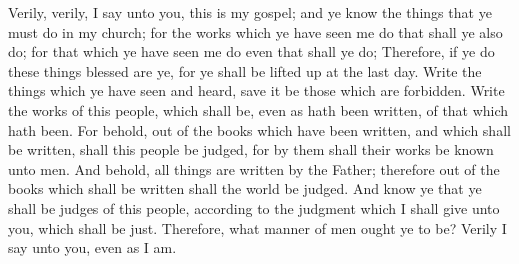 \bverse \iffalse Verily, verily, I say unto you, this is my gospel; and ye know the things that ye must do in my church; for the works which ye have seen me do that shall ye also do; for that which ye have seen me do even that shall ye do; \fi
Verily, verily, I say unto you, this is my gospel; and ye know the things that ye must do in my church; for the works which ye have seen me do that shall ye also do; for that which ye have seen me do even that shall ye do;
\bverse \iffalse Therefore, if ye do these things blessed are ye, for ye shall be lifted up at the last day. \fi
Therefore, if ye do these things blessed are ye, for ye shall be lifted up at the last day.
\bverse \iffalse Write the things which ye have seen and heard, save it be those which are forbidden. \fi
Write the things which ye have seen and heard, save it be those which are forbidden.
\bverse \iffalse Write the works of this people, which shall be, even as hath been written, of that which hath been. \fi
Write the works of this people, which shall be, even as hath been written, of that which hath been.
\bverse \iffalse For behold, out of the books which have been written, and which shall be written, shall this people be judged, for by them shall their works be known unto men. \fi
For behold, out of the books which have been written, and which shall be written, shall this people be judged, for by them shall their works be known unto men.
\bverse \iffalse And behold, all things are written by the Father; therefore out of the books which shall be written shall the world be judged. \fi
And behold, all things are written by the Father; therefore out of the books which shall be written shall the world be judged.
\bverse \iffalse And know ye that ye shall be judges of this people, according to the judgment which I shall give unto you, which shall be just. \fi
And know ye that ye shall be judges of this people, according to the judgment which I shall give unto you, which shall be just.
Therefore, what manner of men ought ye to be? Verily I say unto you, even as I am.

